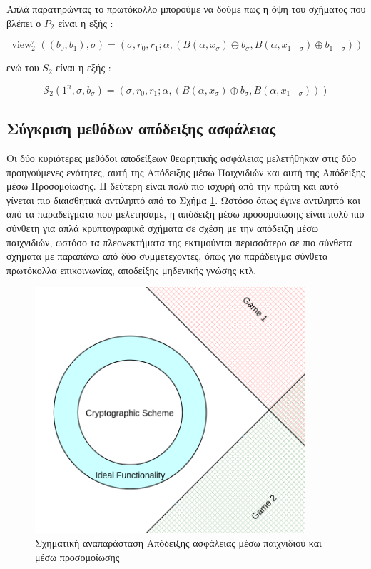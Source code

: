 Απλά παρατηρώντας το πρωτόκολλο μπορούμε να δούμε πως η όψη του σχήματος που βλέπει ο $P_2$ είναι η εξής :

$$
\operatorname{view}_{2}^{\pi}\left(\left(b_{0}, b_{1}\right), \sigma\right)=\left(\sigma, r_{0}, r_{1} ; \alpha,\left(B\left(\alpha, x_{\sigma}\right) \oplus b_{\sigma}, B\left(\alpha, x_{1-\sigma}\right) \oplus b_{1-\sigma}\right)\right)
$$

ενώ του $S_2$ είναι η εξής :

$$
\mathcal{S}_{2}\left(1^{n}, \sigma, b_{\sigma}\right)=\left(\sigma, r_{0}, r_{1} ; \alpha,\left(B\left(\alpha, x_{
\sigma
}\right) \oplus b_{\sigma}, B\left(\alpha, x_{1-\sigma}\right)\right)\right)
$$

\subsection{Σύγκριση μεθόδων απόδειξης ασφάλειας}

Οι δύο κυριότερες μεθόδοι αποδείξεων θεωρητικής ασφάλειας μελετήθηκαν στις δύο προηγούμενες ενότητες, αυτή της Απόδειξης μέσω Παιχνιδιών και αυτή της Απόδειξης μέσω Προσομοίωσης. Η δεύτερη είναι πολύ πιο ισχυρή από την πρώτη και αυτό γίνεται πιο διαισθητικά αντιληπτό από το Σχήμα \ref{fig:game_proof_vs_simulation_proof}. Ωστόσο όπως έγινε αντιληπτό και από τα παραδείγματα που μελετήσαμε, η απόδειξη μέσω προσομοίωσης είναι πολύ πιο σύνθετη για απλά κρυπτογραφικά σχήματα σε σχέση με την απόδειξη μέσω παιχνιδιών, ωστόσο τα πλεονεκτήματα της εκτιμούνται περισσότερο σε πιο σύνθετα σχήματα με παραπάνω από δύο συμμετέχοντες, όπως για παράδειγμα σύνθετα πρωτόκολλα επικοινωνίας, αποδείξης μηδενικής γνώσης κτλ.

\cite{cryptoeprint:2000/067}

\begin{figure}[t]
\includegraphics[width=10cm]{./01_body/images/simulation_vs_game_based_security.png}
\centering
\caption{Σχηματική αναπαράσταση Απόδειξης ασφάλειας μέσω παιχνιδιού και μέσω προσομοίωσης}
\label{fig:game_proof_vs_simulation_proof}
\end{figure}

